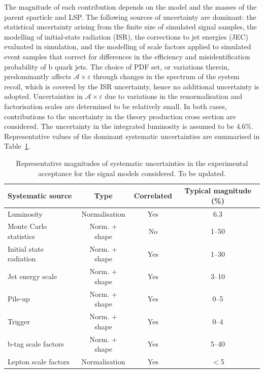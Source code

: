 The magnitude of each contribution depends on the model and the masses
of the parent sparticle and LSP. The following sources of uncertainty
are dominant: the statistical uncertainty arising from the finite size
of simulated signal samples, the modelling of initial-state radiation
(ISR), the corrections to jet energies (JEC) evaluated in simulation,
and the modelling of scale factors applied to simulated event samples
that correct for differences in the efficiency and misidentification
probability of b quark jets. The choice of PDF set, or variations
therein, predominantly affects $\mathcal{A}\times\varepsilon$ through
changes in the \Pt spectrum of the system recoil, which is covered by
the ISR uncertainty, hence no additional uncertainty is
adopted. Uncertainties in $\mathcal{A}\times\varepsilon$ due to
variations in the renormalisation and factorisation scales are
determined to be relatively small. In both cases, contributions to the
uncertainty in the theory production cross section are considered. The
uncertainty in the integrated luminosity is assumed to be
4.6\%. Representative values of the dominant systematic uncertainties
are summarised in Table~\ref{tab:signal_systs}.

\begin{table}[h!]
  \caption{
    Representative magnitudes of systematic uncertainties in the
    experimental acceptance for the signal models considered. 
    {\color{red} To be updated. } 
  }
  \label{tab:signal_systs}
  \centering
  \footnotesize
  \begin{tabular}{ lccc }
    \hline
    \hline
    Systematic source              & Type          & Correlated & Typical magnitude (\%) \\
    \hline
    Luminosity                     & Normalisation & Yes        & 6.3                    \\
    Monte Carlo statistics         & Norm. + shape & No         & 1--50                  \\
    Initial state radiation        & Norm. + shape & Yes        & 1--30                  \\
    Jet energy scale               & Norm. + shape & Yes        & 3--10                  \\
    Pile-up                        & Norm. + shape & Yes        & 0--5                    \\
    Trigger                        & Norm. + shape & Yes        & 0--4                  \\
    b-tag scale factors            & Norm. + shape & Yes        & 5--40                  \\
    Lepton scale factors           & Normalisation & Yes        & $<$5                   \\
    \hline
    \hline
  \end{tabular}
\end{table}
  
